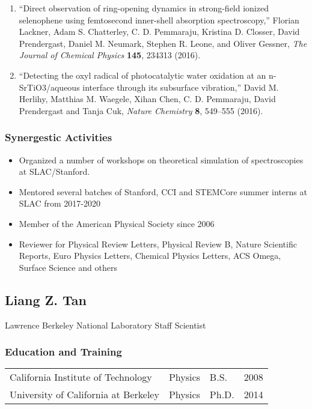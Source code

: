 \begin{enumerate}
    \item “Direct observation of ring-opening dynamics in strong-field ionized selenophene using femtosecond inner-shell absorption spectroscopy,” Florian Lackner, Adam S. Chatterley, C. D. Pemmaraju, Kristina D. Closser, David Prendergast,  Daniel M. Neumark, Stephen R. Leone, and  Oliver Gessner, {\it The Journal of Chemical Physics} {\bf 145}, 234313 (2016).
    \item “Detecting the oxyl radical of photocatalytic water oxidation at an n-SrTiO3/aqueous interface through its subsurface vibration,” David M. Herlihy, Matthias M. Waegele, Xihan Chen, C. D. Pemmaraju, David Prendergast and Tanja Cuk, {\it Nature Chemistry} {\bf 8}, 549–555 (2016).
\end{enumerate}

\subsubsection*{Synergestic Activities}

\begin{itemize}
    \item Organized a number of workshops on theoretical simulation of spectroscopies at SLAC/Stanford.
    \item Mentored several batches of  Stanford, CCI and STEMCore summer interns at SLAC from 2017-2020 
    \item Member of the American Physical Society since 2006
    \item Reviewer for Physical Review Letters, Physical Review B, Nature Scientific Reports, Euro Physics Letters, Chemical Physics Letters, ACS Omega, Surface Science and others 

\end{itemize}

\clearpage

\subsection*{Liang Z. Tan}

Lawrence Berkeley National Laboratory
Staff Scientist

\subsubsection*{Education and Training}

\begin{table}[ht]
    \centering
    \begin{tabular}{llll}
        California Institute of Technology & Physics & B.S. & 2008 \\
        University of California at Berkeley & Physics & Ph.D. & 2014 \\
    \end{tabular}
\end{table}

